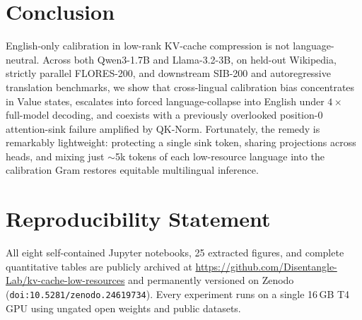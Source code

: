 \documentclass[11pt,a4paper,twocolumn]{article}
\begin{document}
\section{Conclusion}
English-only calibration in low-rank KV-cache compression is not language-neutral. Across both Qwen3-1.7B and Llama-3.2-3B, on held-out Wikipedia, strictly parallel FLORES-200, and downstream SIB-200 and autoregressive translation benchmarks, we show that cross-lingual calibration bias concentrates in Value states, escalates into forced language-collapse into English under $4\times$ full-model decoding, and coexists with a previously overlooked position-0 attention-sink failure amplified by QK-Norm. Fortunately, the remedy is remarkably lightweight: protecting a single sink token, sharing projections across heads, and mixing just $\sim$5k tokens of each low-resource language into the calibration Gram restores equitable multilingual inference.

\section*{Reproducibility Statement}
All eight self-contained Jupyter notebooks, 25 extracted figures, and complete quantitative tables are publicly archived at \url{https://github.com/Disentangle-Lab/kv-cache-low-resources} and permanently versioned on Zenodo (\texttt{doi:10.5281/zenodo.24619734}). Every experiment runs on a single 16\,GB T4 GPU using ungated open weights and public datasets.



\end{document}
